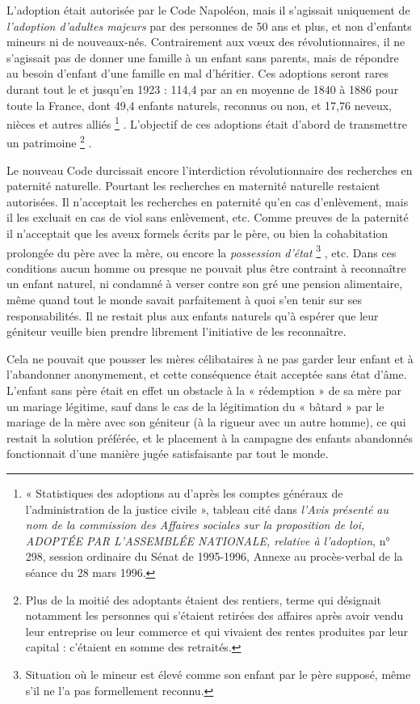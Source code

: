  L'adoption était autorisée par le Code Napoléon, mais il s'agissait uniquement de \emph{l'adoption d'adultes majeurs} par des personnes de 50 ans et plus, et non d'enfants mineurs ni de nouveaux-nés. Contrairement aux vœux des révolutionnaires, il ne s'agissait pas de donner une famille à un enfant sans parents, mais de répondre au besoin d'enfant d'une famille en mal d'héritier. Ces adoptions seront rares durant tout le  et jusqu'en 1923 : 114,4 par an en moyenne de 1840 à 1886 pour toute la France, dont 49,4 enfants naturels, reconnus ou non, et 17,76 neveux, nièces et autres alliés%
\footnote{« Statistiques des adoptions au  d'après les comptes généraux de l'administration de la justice civile », tableau cité dans \emph{l'Avis présenté au nom de la commission des Affaires sociales sur la proposition de loi, ADOPTÉE PAR L'ASSEMBLÉE NATIONALE, relative à l'adoption}, n° 298, session ordinaire du Sénat de 1995-1996, Annexe au procès-verbal de la séance du 28 mars 1996.}%
. L'objectif de ces adoptions était d'abord de transmettre un patrimoine%
\footnote{Plus de la moitié des adoptants étaient des rentiers, terme qui désignait notamment les personnes qui s'étaient retirées des affaires après avoir vendu leur entreprise ou leur commerce et qui vivaient des rentes produites par leur capital : c'étaient en somme des retraités.}%
. 

 Le nouveau Code durcissait encore l'interdiction révolutionnaire des recherches en paternité naturelle. Pourtant les recherches en maternité naturelle restaient autorisées. Il n'acceptait les recherches en paternité qu'en cas d'enlèvement, mais il les excluait en cas de viol sans enlèvement, etc. Comme preuves de la paternité il n'acceptait que les aveux formels écrits par le père, ou bien la cohabitation prolongée du père avec la mère, ou encore la \emph{possession d'état}%
\footnote{Situation où le mineur est élevé comme son enfant par le père supposé, même s'il ne l'a pas formellement reconnu.}%
, etc. Dans ces conditions aucun homme ou presque ne pouvait plus être contraint à reconnaître un enfant naturel, ni condamné à verser contre son gré une pension alimentaire, même quand tout le monde savait parfaitement à quoi s'en tenir sur ses responsabilités. Il ne restait plus aux enfants naturels qu'à espérer que leur géniteur veuille bien prendre librement l'initiative de les reconnaître. 

 Cela ne pouvait que pousser les mères célibataires à ne pas garder leur enfant et à l'abandonner anonymement, et cette conséquence était acceptée sans état d'âme. L'enfant sans père était en effet un obstacle à la « rédemption » de sa mère par un mariage légitime, sauf dans le cas de la légitimation du « bâtard » par le mariage de la mère avec son géniteur (à la rigueur avec un autre homme), ce qui restait la solution préférée, et le placement à la campagne des enfants abandonnés fonctionnait d'une manière jugée satisfaisante par tout le monde. 


